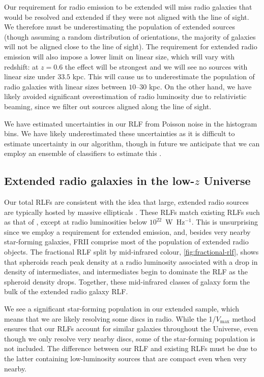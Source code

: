     Our requirement for radio emission to be extended will miss radio galaxies that would be resolved and extended if they were not aligned with the line of sight. We therefore must be underestimating the population of extended sources (though assuming a random distribution of orientations, the majority of galaxies will not be aligned close to the line of sight). The requirement for extended radio emission will also impose a lower limit on linear size, which will vary with redshift: at $z = 0.6$ the effect will be strongest and we will see no sources with linear size under $33.5$ kpc. This will cause us to underestimate the population of radio galaxies with linear sizes between $10$--$30$ kpc. On the other hand, we have likely avoided significant overestimation of radio luminosity due to relativistic beaming, since we filter out sources aligned along the line of sight.

    We have estimated uncertainties in our RLF from Poisson noise in the histogram bins. We
    have likely underestimated these uncertainties as it is difficult to
    estimate uncertainty in our algorithm, though in future we anticipate that we can
    employ an ensemble of classifiers to estimate this \citep[e.g.][]{lakshminarayanan17uncertainty}.

  \subsection{Extended radio galaxies in the low-$z$ Universe}

      Our total RLFs are consistent with the idea that large, extended radio sources are typically hosted by massive ellipticals \citep{best05agn}. These RLFs match existing RLFs such as that of \citet{mauch07rlf}, except at radio luminosities below $10^{22}$~W~Hz$^{-1}$. This is unsurprising since we employ a requirement for extended emission, and, besides very nearby star-forming galaxies, FRII comprise most of the population of extended radio objects. The fractional RLF split by mid-infrared colour, \autoref{fig:fractional-rlf}, shows that spheroids reach peak density at a radio luminosity associated with a drop in density of intermediates, and intermediates begin to dominate the RLF as the spheroid density drops. Together, these mid-infrared classes of galaxy form the bulk of the extended radio galaxy RLF.

      We see a significant star-forming population in our extended sample, which means that we are likely resolving some discs in radio. While the 1/$V_{\max}$ method ensures that our RLFs account for similar galaxies throughout the Universe, even though we only resolve very nearby discs, some of the star-forming population is not included. The difference between our RLF and existing RLFs must be due to the latter containing low-luminosity sources that are compact even when very nearby.

